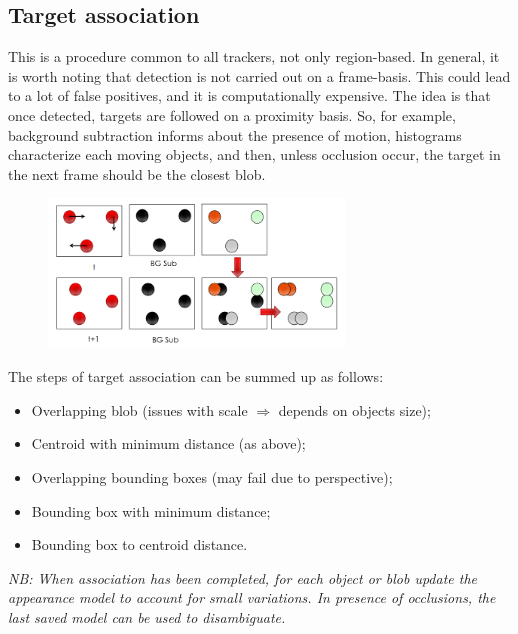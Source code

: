 \subsection{Target association}
This is a procedure common to all trackers, not only region-based. In general, it is worth noting that detection is not carried out on a frame-basis.
This could lead to a lot of false positives, and it is computationally expensive.  
The idea is that once detected, targets are followed on a proximity basis. 
So, for example, background subtraction informs about the presence of motion, histograms characterize each moving objects, and then, unless occlusion occur, the target in the next frame should be the closest blob.
\begin{figure}[h]
\centering
\includegraphics[width=0.7\textwidth]{Figures/Target_association.png}
\end{figure}

The steps of target association can be summed up as follows:
\begin{itemize}
\item Overlapping blob (issues with scale $\Rightarrow$ depends on objects size);
\item Centroid with minimum distance (as above);
\item Overlapping bounding boxes (may fail due to perspective);
\item Bounding box with minimum distance;
\item Bounding box to centroid distance.
\end{itemize}

\textit{NB: When association has been completed, for each object or blob update the appearance model to account for small variations. In presence of occlusions, the last saved model can be used to disambiguate.}

